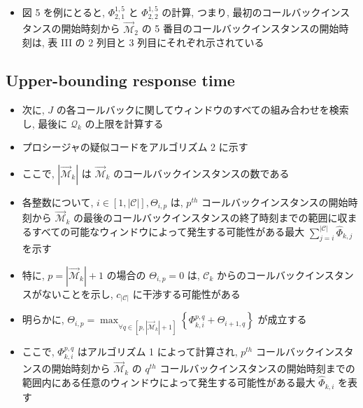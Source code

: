 \begin{frame}{}
    \begin{itemize}
        \item 図 5 を例にとると, $\Phi_{2,1}^{1,5}$ と $\Phi_{2,2}^{1,5}$ の計算, つまり, 最初のコールバックインスタンスの開始時刻から $\overrightarrow{\mathcal{M}}_{2}$ の 5 番目のコールバックインスタンスの開始時刻は, 表 III の 2 列目と 3 列目にそれぞれ示されている
    \end{itemize}
\end{frame}


\subsection{Upper-bounding response time}
\label{ssec: upper bounding response time}

\begin{frame}{}
    \begin{itemize}
        \item 次に, $J$ の各コールバックに関してウィンドウのすべての組み合わせを検索し, 最後に $\mathcal{Q}_{k}$ の上限を計算する
        \item プロシージャの疑似コードをアルゴリズム 2 に示す
        \item ここで, $\left|\overrightarrow{\mathcal{M}}_{k}\right|$ は $\overrightarrow{\mathcal{M}}_{k}$ のコールバックインスタンスの数である
    \end{itemize}
\end{frame}

\begin{frame}{}
    \begin{itemize}
        \item 各整数について, $i \in[1,|\mathcal{C}|], \Theta_{i, p}$ は, $p^{t h}$ コールバックインスタンスの開始時刻から $\overrightarrow{\mathcal{M}}_{k}$ の最後のコールバックインスタンスの終了時刻までの範囲に収まるすべての可能なウィンドウによって発生する可能性がある最大 $\sum_{j=i}^{|\mathcal{C}|} \hat{\Phi}_{k, j}$ を示す
        \item 特に, $p=\left|\overrightarrow{\mathcal{M}}_{k}\right|+1$ の場合の $\Theta_{i, p}=0$ は, $\mathcal{C}_{k}$ からのコールバックインスタンスがないことを示し, $c_{|\mathcal{C}|}$ に干渉する可能性がある
        \item 明らかに, $\Theta_{i, p}=\max _{\forall q \in\left[p,\left|\overrightarrow{\mathcal{M}}_{k}\right|+1\right]}\left\{\Phi_{k, i}^{p, q}+\Theta_{i+1, q}\right\}$ が成立する
        \item ここで, $\Phi_{k, i}^{p, q}$ はアルゴリズム 1 によって計算され, $p^{t h}$ コールバックインスタンスの開始時刻から $\overrightarrow{\mathcal{M}}_{k}$ の $q^{t h}$ コールバックインスタンスの開始時刻までの範囲内にある任意のウィンドウによって発生する可能性がある最大 $\hat{\Phi}_{k, i}$ を表す
    \end{itemize}
\end{frame}

